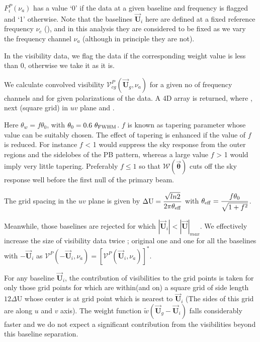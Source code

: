 \documentclass[a4paper,11pt,oneside,english,openany]{sphinxmanual}
\begin{document}
\sphinxAtStartPar
\(F_i^{P}(\nu_a)\) has a value ‘0’ if the data at a given baseline and frequency is flagged and ‘1’ otherwise. Note that the baselines \(\vec{\textbf{U}}_i\) here are defined at a fixed reference frequency \(\nu_c\) (), and in this analysis they are considered to be fixed as we vary the frequency channel \(\nu_a\) (although in principle they are not).

\sphinxAtStartPar
In the visibility data, we flag the data if the corresponding weight value is less than 0, otherwise we take it as it is.

\sphinxAtStartPar
We calculate convolved visibility \(\mathcal{V}_{cg}^{P}(\vec{\textbf{U}}_g,\nu_a)\) for a given no of frequency channels and for given polarizations of the data. A 4D array is returned, where , next  (square grid) in \(uv\) plane and .

\clearpage

\sphinxAtStartPar
Here \(\theta_w = f\theta_0\), with \(\theta_0 = 0.6 \ \theta_{\rm FWHM}\). \(f\) is known as tapering parameter whose value can be suitably chosen. The effect of tapering is enhanced if the value of \(f\) is reduced. For instance \(f\) \textless{} 1 would suppress the sky response from the outer regions and the side\sphinxhyphen{}lobes of the PB pattern, whereas a large value \(f\) \textgreater{} 1 would imply very little tapering.
Preferably \(f\leq 1\) so that \(\mathcal{W}(\vec{\boldsymbol{\theta}})\) cuts off the sky response well before the first null of the primary beam.

\sphinxAtStartPar
The grid spacing in the \(uv\) plane is given by  \(\Delta{\text{U}}=\dfrac{\sqrt{ln2}}{2\pi\theta_{\rm eff}}\) with \(\theta_{\rm eff}=\dfrac{f\theta_0}{\sqrt{1+f^2}}\).

\sphinxAtStartPar
Meanwhile, those baselines are rejected for which \(|\vec{\textbf{U}}_i|<|\vec{\textbf{U}}|_{max}\). We effectively increase the size of visibility data twice ; original one and one for all the baselines with \(-\vec{\textbf{U}}_i\) as \(\mathcal{V}^{P}(-\vec{\textbf{U}}_i,\nu_a) = \left[\mathcal{V}^{P}(\vec{\textbf{U}}_i,\nu_a)\right]^{*}\).

\sphinxAtStartPar
For any baseline \(\vec{\textbf{U}}_i\), the contribution of visibilities to the grid points is taken for only those grid points for which are within(and on) a square grid of side length \(12\Delta{\text{U}}\) whose center is at grid point which is nearest to \(\vec{\textbf{U}}_i\) (The sides of this grid are along \(u\) and \(v\) axis). The weight function  \(\tilde{w}(\vec{\textbf{U}}_g - \vec{\textbf{U}}_i)\) falls considerably faster and we do not expect a significant contribution from the visibilities beyond this baseline separation.
\end{document}
